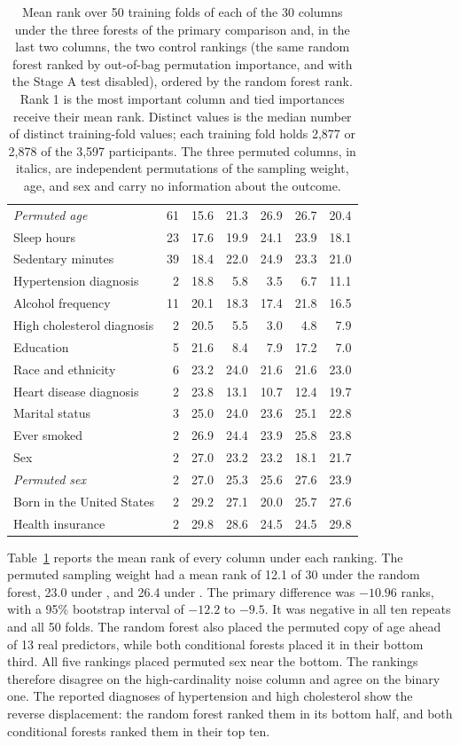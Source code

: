 \documentclass[article]{jss}
\newcommand{\citrees}{\pkg{citrees}\xspace}
\begin{document}
\begin{table}[t!]
\begin{tabular}{@{}lrrrrrr@{}}
\textit{Permuted age} & 61 & 15.6 & 21.3 & 26.9 & 26.7 & 20.4 \\
Sleep hours & 23 & 17.6 & 19.9 & 24.1 & 23.9 & 18.1 \\
Sedentary minutes & 39 & 18.4 & 22.0 & 24.9 & 23.3 & 21.0 \\
Hypertension diagnosis & 2 & 18.8 & 5.8 & 3.5 & 6.7 & 11.1 \\
Alcohol frequency & 11 & 20.1 & 18.3 & 17.4 & 21.8 & 16.5 \\
High cholesterol diagnosis & 2 & 20.5 & 5.5 & 3.0 & 4.8 & 7.9 \\
Education & 5 & 21.6 & 8.4 & 7.9 & 17.2 & 7.0 \\
Race and ethnicity & 6 & 23.2 & 24.0 & 21.6 & 21.6 & 23.0 \\
Heart disease diagnosis & 2 & 23.8 & 13.1 & 10.7 & 12.4 & 19.7 \\
Marital status & 3 & 25.0 & 24.0 & 23.6 & 25.1 & 22.8 \\
Ever smoked & 2 & 26.9 & 24.4 & 23.9 & 25.8 & 23.8 \\
Sex & 2 & 27.0 & 23.2 & 23.2 & 18.1 & 21.7 \\
\textit{Permuted sex} & 2 & 27.0 & 25.3 & 25.6 & 27.6 & 23.9 \\
Born in the United States & 2 & 29.2 & 27.1 & 20.0 & 25.7 & 27.6 \\
Health insurance & 2 & 29.8 & 28.6 & 24.5 & 24.5 & 29.8 \\
\bottomrule
\end{tabular}
\caption{Mean rank over 50 training folds of
each of the 30 columns under the three forests of the primary comparison and,
in the last two columns, the two control rankings (the same random forest
ranked by out-of-bag permutation importance, and \citrees with the Stage A
test disabled), ordered by the random forest rank. Rank 1 is the most
important column and tied importances receive their mean rank. Distinct
values is the median number of distinct training-fold values; each training
fold holds 2,877 or 2,878 of the 3,597 participants. The three permuted
columns, in italics, are independent permutations of the sampling weight,
age, and sex and carry no information about the outcome.}
\label{tab:nhanes-ranks}
\end{table}

Table~\ref{tab:nhanes-ranks} reports the mean rank of every column under each
ranking. The permuted sampling weight had a mean rank of 12.1 of 30 under the
random forest, 23.0 under \citrees, and 26.4 under . The primary
difference was $-10.96$ ranks, with a 95\% bootstrap interval of $-12.2$ to
$-9.5$. It was negative in all ten repeats and all 50 folds. The random forest
also placed the permuted copy of age ahead of 13 real predictors, while both
conditional forests placed it in their bottom third. All five rankings placed
permuted sex near the bottom. The rankings therefore disagree on the
high-cardinality noise column and agree on the binary one. The reported
diagnoses of hypertension and high cholesterol show the reverse displacement:
the random forest ranked them in its bottom half, and both conditional forests
ranked them in their top ten.
\end{document}
